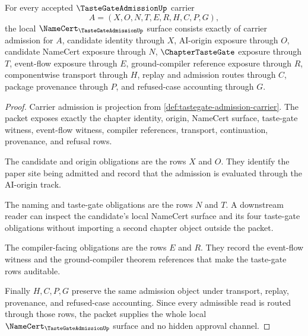 \begin{theorem}
\label{thm:tastegate-admission-namecert-obligations}
For every accepted $\TasteGateAdmissionUp$ carrier
$$
A=(X,O,N,T,E,R,H,C,P,G),
$$
the local $\NameCert_{\TasteGateAdmissionUp}$ surface consists exactly of carrier admission for $A$, candidate identity through $X$, AI-origin exposure through $O$, candidate NameCert exposure through $N$, $\ChapterTasteGate$ exposure through $T$, event-flow exposure through $E$, ground-compiler reference exposure through $R$, componentwise transport through $H$, replay and admission routes through $C$, package provenance through $P$, and refused-case accounting through $G$.
\end{theorem}
\begin{proof}
Carrier admission is projection from \autoref{def:tastegate-admission-carrier}. The packet exposes exactly the chapter identity, origin, NameCert surface, taste-gate witness, event-flow witness, compiler references, transport, continuation, provenance, and refusal rows.

The candidate and origin obligations are the rows $X$ and $O$. They identify the paper site being admitted and record that the admission is evaluated through the AI-origin track.

The naming and taste-gate obligations are the rows $N$ and $T$. A downstream reader can inspect the candidate's local NameCert surface and its four taste-gate obligations without importing a second chapter object outside the packet.

The compiler-facing obligations are the rows $E$ and $R$. They record the event-flow witness and the ground-compiler theorem references that make the taste-gate rows auditable.

Finally $H,C,P,G$ preserve the same admission object under transport, replay, provenance, and refused-case accounting. Since every admissible read is routed through those rows, the packet supplies the whole local $\NameCert_{\TasteGateAdmissionUp}$ surface and no hidden approval channel.
\end{proof}

